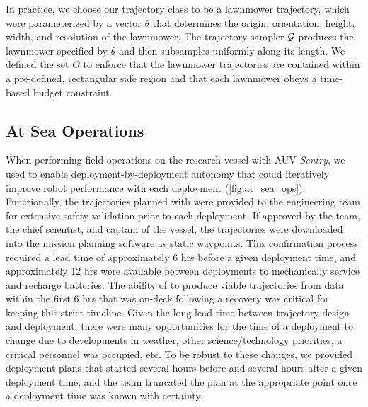 In practice, we choose our trajectory class to be a lawnmower trajectory, which were parameterized by a vector $\theta$ that determines the origin, orientation, height, width, and resolution of the lawnmower. The trajectory sampler $\mathcal{G}$ produces the lawnmower specified by $\theta$ and then subsamples uniformly along its length. We defined the set $\Theta$ to enforce that the lawnmower trajectories are contained within a pre-defined, rectangular safe region and that each lawnmower obeys a time-based budget constraint.


\subsection{At Sea Operations}
When performing field operations on the research vessel with AUV \emph{Sentry}, we used \PHORTEX to enable deployment-by-deployment autonomy that could iteratively improve robot performance with each deployment (\cref{fig:at_sea_ops}). Functionally, the trajectories planned with \PHORTEX were provided to the \Sentry engineering team for extensive safety validation prior to each deployment. If approved by the \Sentry team, the chief scientist, and captain of the vessel, the trajectories were downloaded into the \Sentry mission planning software as static waypoints. This confirmation process required a lead time of approximately 6 hrs before a given deployment time, and approximately 12 hrs were available between deployments to mechanically service \Sentry and recharge batteries. The ability of \PHORTEX to produce viable trajectories from data within the first 6 hrs that \Sentry was on-deck following a recovery was critical for keeping this strict timeline. Given the long lead time between trajectory design and \Sentry deployment, there were many opportunities for the time of a deployment to change due to developments in weather, other science/technology priorities, a critical personnel was occupied, etc. To be robust to these changes, we provided deployment plans that started several hours before and several hours after a given deployment time, and the \Sentry team truncated the plan at the appropriate point once a deployment time was known with certainty.

